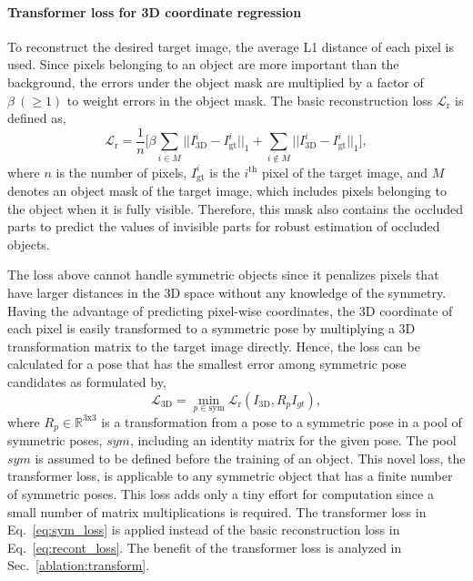 \documentclass[10pt,twocolumn,letterpaper]{article}
\begin{document}
\paragraph{Transformer loss for 3D coordinate regression} \label{transformer}
To reconstruct the desired target image, the average L1 distance of each pixel is used. Since pixels belonging to an object are more important than the background, the errors under the object mask are multiplied by a factor of $\beta~(\geq1)$ to weight errors in the object mask. The basic reconstruction loss $\mathcal{L}_\textrm{r}$ is defined as,
\begin{equation} \label{eq:recont_loss}    
\mathcal{L}_\textrm{r} = \frac{1}{n} \Big[ \beta\sum_{i \in M}||I_\textrm{3D}^i-I_\textrm{gt}^i||_1 + \sum_{i \notin M} ||I_\textrm{3D}^i-I_\textrm{gt}^i||_1 \Big],
\end{equation} 
where $n$ is the number of pixels, $I_\textrm{gt}^i$ is the $i^\textrm{th}$ pixel of the target image, and $M$ denotes an object mask of the target image, which includes pixels belonging to the object when it is fully visible. Therefore, this mask also contains the occluded parts to predict the values of invisible parts for robust estimation of occluded objects.

The loss above cannot handle symmetric objects since it penalizes pixels that have larger distances in the 3D space without any knowledge of the symmetry. Having the advantage of predicting pixel-wise coordinates, the 3D coordinate of each pixel is easily transformed to a symmetric pose by multiplying a 3D transformation matrix to the target image directly. Hence, the loss can be calculated for a pose that has the smallest error among symmetric pose candidates as formulated by, 
\begin{equation} \label{eq:sym_loss}    
\mathcal{L}_\textrm{3D}= \min_{p \in \textrm{sym}}  \mathcal{L}_\textrm{r}(I_\textrm{3D},R_{p}I_{gt}), 
\end{equation} 
where $R_{p} \in \mathbb{R}^{3\textrm{x}3}$ is a transformation from a pose to a symmetric pose in a pool of symmetric poses, $sym$, including an identity matrix for the given pose. The pool $sym$ is assumed to be defined before the training of an object. This novel loss, the transformer loss, is applicable to any symmetric object that has a finite number of symmetric poses. This loss adds only a tiny effort for computation since a small number of matrix multiplications is required. The transformer loss in Eq.~\ref{eq:sym_loss} is applied instead of the basic reconstruction loss in Eq.~\ref{eq:recont_loss}. The benefit of the transformer loss is analyzed in Sec.~\ref{ablation:transform}. 
\end{document}
